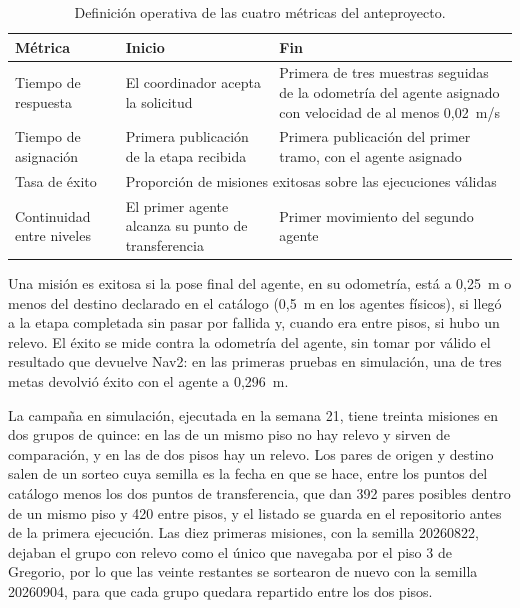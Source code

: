 \begin{table}[H]
  \centering\footnotesize
  \caption{Definición operativa de las cuatro métricas del anteproyecto.}
  \label{tab:metricas}
  \begin{tabular}{@{}p{}p{}p{}@{}}
    \toprule
    \textbf{Métrica} & \textbf{Inicio} & \textbf{Fin} \\ \midrule
    Tiempo de respuesta & El coordinador acepta la solicitud & Primera de tres muestras seguidas de la odometría del agente asignado con velocidad de al menos 0,02~m/s \\ \addlinespace
    Tiempo de asignación & Primera publicación de la etapa recibida & Primera publicación del primer tramo, con el agente asignado \\ \addlinespace
    Tasa de éxito & \multicolumn{2}{p{0.72\textwidth}}{Proporción de misiones exitosas sobre las ejecuciones válidas} \\ \addlinespace
    Continuidad entre niveles & El primer agente alcanza su punto de transferencia & Primer movimiento del segundo agente \\ \bottomrule
  \end{tabular}
\end{table}

Una misión es exitosa si la pose final del agente, en su odometría, está a 0,25~m o menos del destino declarado en el catálogo (0,5~m en los agentes físicos), si llegó a la etapa completada sin pasar por fallida y, cuando era entre pisos, si hubo un relevo. El éxito se mide contra la odometría del agente, sin tomar por válido el resultado que devuelve Nav2: en las primeras pruebas en simulación, una de tres metas devolvió éxito con el agente a 0,296~m.

La campaña en simulación, ejecutada en la semana 21, tiene treinta misiones en dos grupos de quince: en las de un mismo piso no hay relevo y sirven de comparación, y en las de dos pisos hay un relevo. Los pares de origen y destino salen de un sorteo cuya semilla es la fecha en que se hace, entre los puntos del catálogo menos los dos puntos de transferencia, que dan 392 pares posibles dentro de un mismo piso y 420 entre pisos, y el listado se guarda en el repositorio antes de la primera ejecución. Las diez primeras misiones, con la semilla 20260822, dejaban el grupo con relevo como el único que navegaba por el piso 3 de Gregorio, por lo que las veinte restantes se sortearon de nuevo con la semilla 20260904, para que cada grupo quedara repartido entre los dos pisos.

